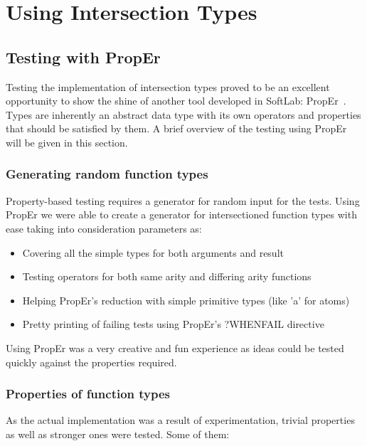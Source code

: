 \chapter{Using Intersection Types}
\label{chp:intersection_usage}

\section{Testing with PropEr}

Testing the implementation of intersection types proved to be an
excellent opportunity to show the shine of another tool developed in
SoftLab: PropEr~\cite{Manolis}. Types are inherently an abstract data
type with its own operators and properties that should be satisfied by
them. A brief overview of the testing using PropEr will be given in
this section.

\subsection{Generating random function types}

Property-based testing requires a generator for random input for the
tests. Using PropEr we were able to create a generator for
intersectioned function types with ease taking into consideration
parameters as:
\begin{itemize}
\item Covering all the simple types for both arguments and result
\item Testing operators for both same arity and differing arity functions
\item Helping PropEr's reduction with simple primitive types (like 'a'
  for atoms)
\item Pretty printing of failing tests using PropEr's ?WHENFAIL directive
\end{itemize}

Using PropEr was a very creative and fun experience as ideas could be
tested quickly against the properties required.

\subsection{Properties of function types}

As the actual implementation was a result of experimentation, trivial
properties as well as stronger ones were tested. Some of them:

